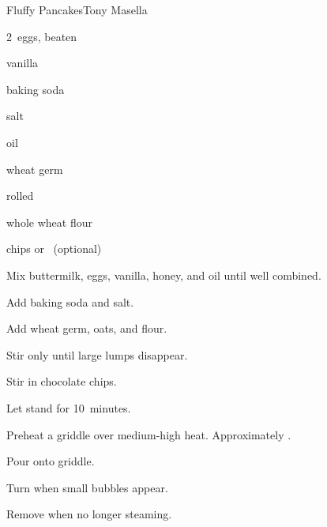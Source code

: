 \begin{recipe}{Fluffy Pancakes}{Tony Masella}{}

\begin{ingredients}
\item {} 
\item 2~eggs, beaten
\item {} vanilla
\item {} baking soda
\item \tp{\half} salt
\item \C{\quarter} oil
\item \C{\quarter} 
\item \C{\quarter} wheat germ
\item \C{\quarter} rolled 
\item \C{1\half} whole wheat flour
\item {} chips or ~(optional)
\end{ingredients}

\begin{directions}
\item Mix buttermilk, eggs, vanilla, honey, and oil until well combined.
\item Add baking soda and salt.
\item Add wheat germ, oats, and flour.
\item Stir only until large lumps disappear.
\item Stir in chocolate chips.
\item Let stand for 10~minutes.
\item Preheat a griddle over medium-high heat. Approximately .
\item Pour onto griddle.
\item Turn when small bubbles appear.
\item Remove when no longer steaming.
\end{directions}

\end{recipe}
